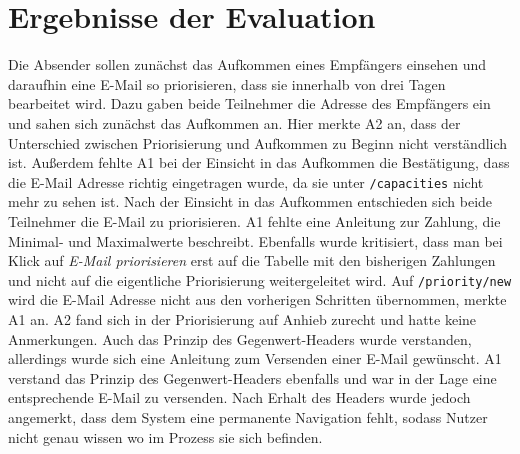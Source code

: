 \section{Ergebnisse der Evaluation}
\label{Ergebnisse der Evaluation}
Die Absender sollen zunächst das Aufkommen eines Empfängers einsehen und daraufhin eine E-Mail so priorisieren, dass sie innerhalb von drei Tagen bearbeitet wird. Dazu gaben beide Teilnehmer die Adresse des Empfängers ein und sahen sich zunächst das Aufkommen an. Hier merkte A2 an, dass der Unterschied zwischen Priorisierung und Aufkommen zu Beginn nicht verständlich ist. Außerdem fehlte A1 bei der Einsicht in das Aufkommen die Bestätigung, dass die E-Mail Adresse richtig eingetragen wurde, da sie unter \texttt{/capacities} nicht mehr zu sehen ist. Nach der Einsicht in das Aufkommen entschieden sich beide Teilnehmer die E-Mail zu priorisieren. A1 fehlte eine Anleitung zur Zahlung, die Minimal- und Maximalwerte beschreibt. Ebenfalls wurde kritisiert, dass man bei Klick auf \textit{E-Mail priorisieren} erst auf die Tabelle mit den bisherigen Zahlungen und nicht auf die eigentliche Priorisierung weitergeleitet wird. Auf \texttt{/priority/new} wird die E-Mail Adresse nicht aus den vorherigen Schritten übernommen, merkte A1 an. A2 fand sich in der Priorisierung auf Anhieb zurecht und hatte keine Anmerkungen. Auch das Prinzip des Gegenwert-Headers wurde verstanden, allerdings wurde sich eine Anleitung zum Versenden einer E-Mail gewünscht. A1 verstand das Prinzip des Gegenwert-Headers ebenfalls und war in der Lage eine entsprechende E-Mail zu versenden. Nach Erhalt des Headers wurde jedoch angemerkt, dass dem System eine permanente Navigation fehlt, sodass Nutzer nicht genau wissen wo im Prozess sie sich befinden.

